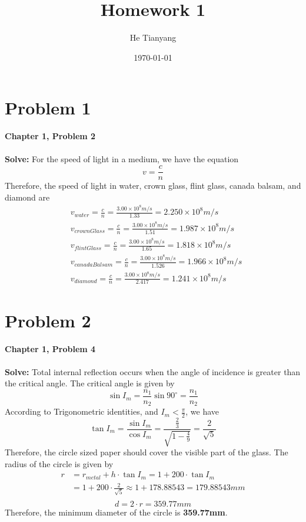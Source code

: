 \documentclass{article}
\title{Homework 1}
\author{He Tianyang}
\date{\today}
\begin{document}
\maketitle

\section{Problem 1}
\textbf{Chapter 1, Problem 2}\\\\
\textbf{Solve:} For the speed of light in a medium, we have the equation
\begin{equation}
    v = \frac{c}{n}
\end{equation}
Therefore, the speed of light in water, crown glass, flint glass, canada balsam, and diamond are
\begin{align}
     & v_{water}        =\frac{c}{n
    }=\frac{3.00\times10^8 m/s}{1.33}=2.250\times10^8 m/s                                  \\
     & v_{crownGlass}   =\frac{c}{n}=\frac{3.00\times10^8 m/s}{1.51}=1.987\times10^8 m/s   \\
     & v_{flintGlass}   =\frac{c}{n}=\frac{3.00\times10^8 m/s}{1.65}=1.818\times10^8 m/s   \\
     & v_{canadaBalsam}  =\frac{c}{n}=\frac{3.00\times10^8 m/s}{1.526}=1.966\times10^8 m/s \\
     & v_{diamond}       =\frac{c}{n}=\frac{3.00\times10^8 m/s}{2.417}=1.241\times10^8 m/s
\end{align}

\section{Problem 2}
\textbf{Chapter 1, Problem 4}\\\\
\textbf{Solve:} Total internal reflection occurs when the angle of incidence is greater than the critical angle. The critical angle is given by
\begin{equation}
    \sin I_m = \frac{n_1}{n_2}\sin 90^\circ = \frac{n_1}{n_2}
\end{equation}
According to Trigonometric identities, and $I_m<\frac{\pi}{2}$, we have
\begin{equation}
    \tan I_m = \frac{\sin I_m}{\cos I_m} = \frac{\frac{2}{3}}{\sqrt{1-\frac{4}{9}}} = \frac{2}{\sqrt{5}}
\end{equation}
Therefore, the circle sized paper should cover the visible part of the glass. The radius of the circle is given by
\begin{align}
    r & = r_{metal}+h\cdot\tan I_m = 1+200\cdot\tan I_m                \\
      & = 1+200\cdot\frac{2}{\sqrt{5}} \approx 1+178.88543=179.88543mm \\
\end{align}
\begin{equation}
    \boxed{d  =2\cdot r = 359.77mm}
\end{equation}
Therefore, the minimum diameter of the circle is \textbf{359.77mm}.
\end{document}
